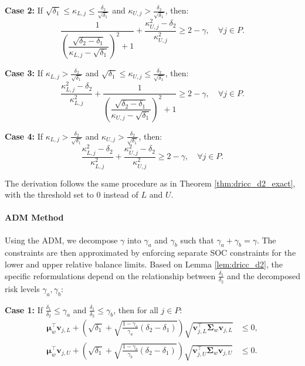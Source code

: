 \documentclass[preprint,12pt,authoryear]{elsarticle}
\begin{document}
\textbf{Case 2:} If $\sqrt{\delta_1} \leqslant \kappa_{L,j} \leqslant \frac{\delta_2}{\sqrt{\delta_1}}$ and $\kappa_{U,j} > \frac{\delta_2}{\sqrt{\delta_1}}$, then:
\begin{equation}
\dfrac{1}{\left( \dfrac{\sqrt{\delta_2 - \delta_1}}{\kappa_{L,j} - \sqrt{\delta_1}} \right)^{2} + 1} + \dfrac{\kappa_{U,j}^{2} - \delta_2}{\kappa_{U,j}^{2}} \geqslant 2 - \gamma, \quad \forall j \in P.
\label{eq:assign_dep_rel_balance_d2_exact_case2}
\end{equation}

\textbf{Case 3:} If $\kappa_{L,j} > \frac{\delta_2}{\sqrt{\delta_1}}$ and $\sqrt{\delta_1} \leqslant \kappa_{U,j} \leqslant \frac{\delta_2}{\sqrt{\delta_1}}$, then:
\begin{equation}
\dfrac{\kappa_{L,j}^{2} - \delta_2}{\kappa_{L,j}^{2}} + \dfrac{1}{\left( \dfrac{\sqrt{\delta_2 - \delta_1}}{\kappa_{U,j} - \sqrt{\delta_1}} \right)^{2} + 1} \geqslant 2 - \gamma, \quad \forall j \in P.
\label{eq:assign_dep_rel_balance_d2_exact_case3}
\end{equation}

\textbf{Case 4:} If $\kappa_{L,j} > \frac{\delta_2}{\sqrt{\delta_1}}$ and $\kappa_{U,j} > \frac{\delta_2}{\sqrt{\delta_1}}$, then:
\begin{equation}
\dfrac{\kappa_{L,j}^{2} - \delta_2}{\kappa_{L,j}^{2}} + \dfrac{\kappa_{U,j}^{2} - \delta_2}{\kappa_{U,j}^{2}} \geqslant 2 - \gamma, \quad \forall j \in P.
\label{eq:assign_dep_rel_balance_d2_exact_case4}
\end{equation}

The derivation follows the same procedure as in Theorem \ref{thm:dricc_d2_exact}, with the threshold set to 0 instead of $L$ and $U$.

\paragraph{ADM Method}
Using the ADM, we decompose $\gamma$ into $\gamma_a$ and $\gamma_b$ such that $\gamma_a + \gamma_b = \gamma$. The constraints are then approximated by enforcing separate SOC constraints for the lower and upper relative balance limits. Based on Lemma \ref{lem:dricc_d2}, the specific reformulations depend on the relationship between $\frac{\delta_1}{\delta_2}$ and the decomposed risk levels $\gamma_a, \gamma_b$:

\textbf{Case 1:} If $\frac{\delta_1}{\delta_2} \leqslant \gamma_a$ and $\frac{\delta_1}{\delta_2} \leqslant \gamma_b$, then for all $j \in P$:
\begin{align}
\boldsymbol{\mu}_w^\top \mathbf{v}_{j,L} + \left(\sqrt{\delta_1} + \sqrt{\frac{1 - \gamma_a}{\gamma_a} (\delta_2 - \delta_1)}\right) \sqrt{\mathbf{v}_{j,L}^\top \boldsymbol{\Sigma}_w \mathbf{v}_{j,L}} &\leqslant 0, \label{eq:assign_dep_rel_balance_d2_adm_case1_lower} \\
\boldsymbol{\mu}_w^\top \mathbf{v}_{j,U} + \left(\sqrt{\delta_1} + \sqrt{\frac{1 - \gamma_b}{\gamma_b} (\delta_2 - \delta_1)}\right) \sqrt{\mathbf{v}_{j,U}^\top \boldsymbol{\Sigma}_w \mathbf{v}_{j,U}} &\leqslant 0. \label{eq:assign_dep_rel_balance_d2_adm_case1_upper}
\end{align}
\end{document}
